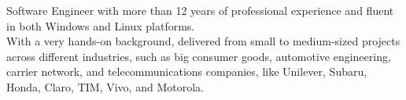 \par{
Software Engineer with more than 12 years of professional experience and fluent in both Windows and Linux platforms.\\
With a very hands-on background, delivered from small to medium-sized projects across different industries, such as big consumer goods, automotive engineering, carrier network, and telecommunications companies, like Unilever, Subaru, Honda, Claro, TIM, Vivo, and Motorola.
}
